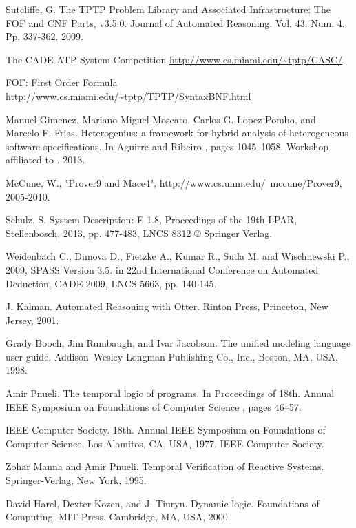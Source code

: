 
\begin{thebibliography}{tesis}

	Sutcliffe, G. The TPTP Problem Library and Associated Infrastructure: The FOF and CNF Parts, v3.5.0. Journal of Automated Reasoning. Vol. 43. Num. 4. Pp. 337-362. 2009.

	The CADE ATP System Competition
	\url{http://www.cs.miami.edu/~tptp/CASC/}

	FOF: First Order Formula
	\url{http://www.cs.miami.edu/~tptp/TPTP/SyntaxBNF.html}

	Manuel Gimenez, Mariano Miguel Moscato, Carlos G. Lopez Pombo, and Marcelo F. Frias. Heterogenius: a framework for hybrid analysis of heterogeneous software specifications. In Aguirre and Ribeiro \cite{AR13}, pages 1045–1058. Workshop affiliated to \cite{DM13}. 2013.
	
	McCune, W., "Prover9 and Mace4", http://www.cs.unm.edu/~mccune/Prover9, 2005-2010. 

  Schulz, S. System Description: E 1.8, Proceedings of the 19th LPAR, Stellenbosch, 2013, pp. 477-483, LNCS 8312 © Springer Verlag.

 Weidenbach C., Dimova D., Fietzke A., Kumar R., Suda M. and Wischnewski P., 2009, SPASS Version 3.5. in 22nd International Conference on Automated Deduction, CADE 2009, LNCS 5663, pp. 140-145.

 J. Kalman. Automated Reasoning with Otter. Rinton Press, Princeton, New Jersey,
2001.

 Grady Booch, Jim Rumbaugh, and Ivar Jacobson. The unified modeling language user guide. Addison–Wesley Longman Publishing Co., Inc., Boston, MA, USA, 1998.

 Amir Pnueli. The temporal logic of programs. In Proceedings of 18th. Annual IEEE Symposium on Foundations of Computer Science \cite{IEE77}, pages 46–57. 

 IEEE Computer Society. 18th. Annual IEEE Symposium on Foundations of Computer Science, Los Alamitos, CA, USA, 1977. IEEE Computer Society. 

 Zohar Manna and Amir Pnueli. Temporal Verification of Reactive Systems. Springer-Verlag, New York, 1995. 

 David Harel, Dexter Kozen, and J. Tiuryn. Dynamic logic. Foundations of Computing. MIT Press, Cambridge, MA, USA, 2000.  


\end{thebibliography}
